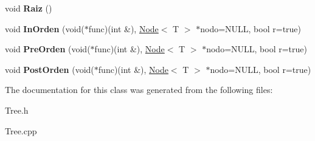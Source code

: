 \begin{DoxyCompactItemize}
void {\bfseries Raiz} ()
\item 
\mbox{\label{classTree_a7475030e0bdcfb79325c0f0037bbb0ad}} 
void {\bfseries In\+Orden} (void($\ast$func)(int \&), \hyperlink{classNode}{Node}$<$ T $>$ $\ast$nodo=N\+U\+LL, bool r=true)
\item 
\mbox{\label{classTree_aa19891769e5056606fc2fd3ef10d771b}} 
void {\bfseries Pre\+Orden} (void($\ast$func)(int \&), \hyperlink{classNode}{Node}$<$ T $>$ $\ast$nodo=N\+U\+LL, bool r=true)
\item 
\mbox{\label{classTree_aa4c07f4f7904919a48681dc5da8d113a}} 
void {\bfseries Post\+Orden} (void($\ast$func)(int \&), \hyperlink{classNode}{Node}$<$ T $>$ $\ast$nodo=N\+U\+LL, bool r=true)
\end{DoxyCompactItemize}


The documentation for this class was generated from the following files\+:\begin{DoxyCompactItemize}
\item 
Tree.\+h\item 
Tree.\+cpp\end{DoxyCompactItemize}
